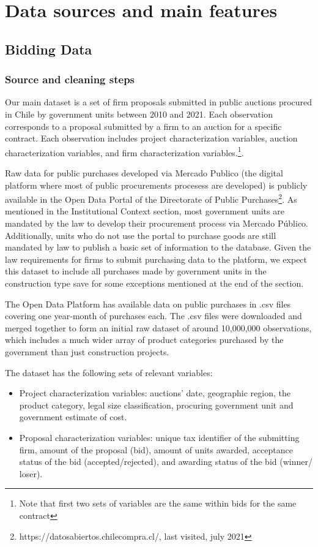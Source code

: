 
\chapter{Data sources and main features}

\section{Bidding Data}
\subsection{Source and cleaning steps}
Our main dataset is a set of firm proposals submitted in public auctions procured in Chile by government units between 2010 and 2021. Each observation corresponds to a proposal submitted by a firm to an auction for a specific contract. Each observation includes project characterization variables, auction characterization variables, and firm characterization variables.\footnote{Note that first two sets of variables are the same within bids for the same contract}.

Raw data for public purchases developed via Mercado Publico (the digital platform where most of public procurements procesess are developed) is publicly available in the Open Data Portal of the Directorate of Public Purchases\footnote{https://datosabiertos.chilecompra.cl/, last visited, july 2021}. As mentioned in the Institutional Context section, most government units are mandated by the law to develop their procurement process via Mercado Público. Additionally, units who do not use the portal to purchase goods are still mandated by law to publish a basic set of information to the database. Given the law requirements for firms to submit purchasing data to the platform, we expect this dataset to include all purchases made by government units in the construction type save for some exceptions mentioned at the end of the section.

The Open Data Platform has available data on public purchases in .csv files covering one year-month of purchases each. The .csv files were downloaded and merged together to form an initial raw dataset of around 10,000,000 observations, which includes a much wider array of product categories purchased by the government than just construction projects.

The dataset has the following sets of relevant variables:
\begin{itemize}[itemsep=0.5pt]
  \item Project characterization variables: auctions’ date, geographic region, the product category, legal size classification, procuring government unit and government estimate of cost.
  \item Proposal characterization variables: unique tax identifier of the submitting firm, amount of the proposal (bid), amount of units awarded, acceptance status of the bid (accepted/rejected), and awarding status of the bid (winner/ loser).
\end{itemize}

